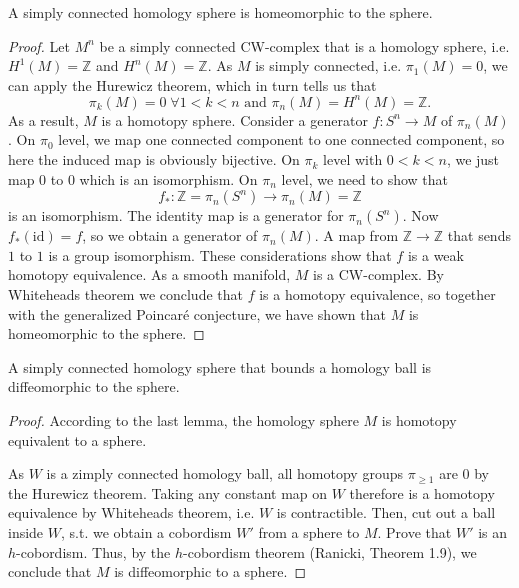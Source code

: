 \begin{lemma}
    A simply connected homology sphere is homeomorphic to the sphere.
\end{lemma}
\begin{proof}
    Let $M^n$ be a simply connected CW-complex that is a homology sphere, i.e. $H^1(M) = \mathbb Z$ and $H^n(M) = \mathbb Z$. 
    As $M$ is simply connected, i.e. $\pi_1(M) = 0$, we can apply the Hurewicz theorem, which in turn tells us that
    \[
    \pi_k(M) = 0 \; \forall 1 < k < n\text{ and }\pi_n(M) = H^n(M) = \mathbb Z.
    \]
    As a result, $M$ is a homotopy sphere.
    Consider a generator $f: S^n \to M$ of $\pi_n(M)$.
    On $\pi_0$ level, we map one connected component to one connected component, so here the induced map is obviously bijective.
    On $\pi_k$ level with $0 < k < n$, we just map $0$ to $0$ which is an isomorphism.
    On $\pi_n$ level, we need to show that 
    \[
        f_*: \mathbb Z = \pi_n(S^n) \to \pi_n(M) = \mathbb Z 
    \]
    is an isomorphism. The identity map is a generator for $\pi_n(S^n)$. Now $f_*(\mathrm{id}) = f$, so we obtain a generator of $\pi_n(M)$. A map from $\mathbb Z \to \mathbb Z$ that sends $1$ to $1$ is a group isomorphism. These considerations show that $f$ is a weak homotopy equivalence.
    As a smooth manifold, $M$ is a CW-complex. By Whiteheads theorem we conclude that $f$ is a homotopy equivalence, so together with the generalized Poincar\'e conjecture, we have shown that $M$ is homeomorphic to the sphere.
\end{proof}

\begin{lemma}
    A simply connected homology sphere that bounds a homology ball is diffeomorphic to the sphere.
\end{lemma}
\begin{proof}
    According to the last lemma, the homology sphere $M$ is homotopy equivalent to a sphere.

    As $W$ is a zimply connected homology ball, all homotopy groups $\pi_{\ge 1}$ are 0 by the Hurewicz theorem.
    Taking any constant map on $W$ therefore is a homotopy equivalence by Whiteheads theorem, i.e. $W$ is contractible. 
    Then, cut out a ball inside $W$, s.t. we obtain a cobordism $W'$ from a sphere to $M$.
    Prove that $W'$ is an $h$-cobordism.
    Thus, by the $h$-cobordism theorem (Ranicki, Theorem 1.9), we conclude that
    $M$ is diffeomorphic to a sphere.
\end{proof}